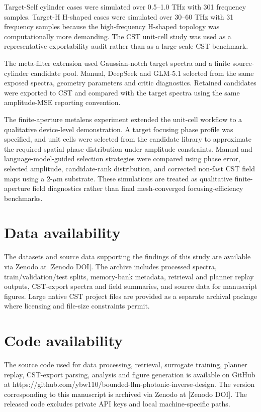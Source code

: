 \documentclass[final,1p,times]{elsarticle}
\begin{document}
Target-Self cylinder cases were simulated over 0.5--1.0 THz with 301 frequency samples. Target-H H-shaped cases were simulated over 30--60 THz with 31 frequency samples because the high-frequency H-shaped topology was computationally more demanding. The CST unit-cell study was used as a representative exportability audit rather than as a large-scale CST benchmark.

The meta-filter extension used Gaussian-notch target spectra and a finite source-cylinder candidate pool. Manual, DeepSeek and GLM-5.1 selected from the same exposed spectra, geometry parameters and critic diagnostics. Retained candidates were exported to CST and compared with the target spectra using the same amplitude-MSE reporting convention.

The finite-aperture metalens experiment extended the unit-cell workflow to a qualitative device-level demonstration. A target focusing phase profile was specified, and unit cells were selected from the candidate library to approximate the required spatial phase distribution under amplitude constraints. Manual and language-model-guided selection strategies were compared using phase error, selected amplitude, candidate-rank distribution, and corrected non-fast CST field maps using a 2-$\mu$m substrate. These simulations are treated as qualitative finite-aperture field diagnostics rather than final mesh-converged focusing-efficiency benchmarks.











\section*{Data availability}

The datasets and source data supporting the findings of this study are available via Zenodo at [Zenodo DOI]. The archive includes processed spectra, train/validation/test splits, memory-bank metadata, retrieval and planner replay outputs, CST-export spectra and field summaries, and source data for manuscript figures. Large native CST project files are provided as a separate archival package where licensing and file-size constraints permit.

\section*{Code availability}

The source code used for data processing, retrieval, surrogate training, planner replay, CST-export parsing, analysis and figure generation is available on GitHub at https://github.com/ybw110/bounded-llm-photonic-inverse-design. The version corresponding to this manuscript is archived via Zenodo at [Zenodo DOI]. The released code excludes private API keys and local machine-specific paths.



\end{document}
